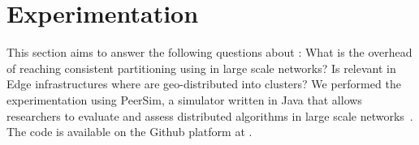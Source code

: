 
\newcommand{\FIGSCALE}{0.99}

\section{Experimentation}
\label{sec:experimentation}


This section aims to answer the following questions about \NAME: What
is the overhead of reaching consistent partitioning using \NAME in
large scale networks?  Is \NAME relevant in Edge infrastructures where
\processes are geo-distributed into clusters? We performed the
experimentation using PeerSim, a simulator written in Java that allows
researchers to evaluate and assess distributed algorithms in large
scale networks~\cite{montresor2009peersim}. The code is available on
the Github platform at
.


